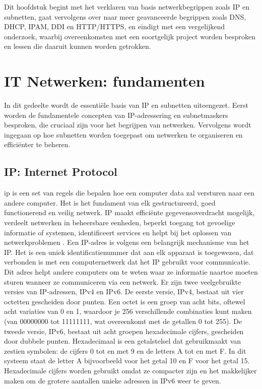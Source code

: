 Dit hoofdstuk begint met het verklaren van basis netwerkbegrippen zoals IP en subnetten, gaat vervolgens over naar meer geavanceerde begrippen zoals DNS, DHCP, IPAM, DDI en HTTP/HTTPS, en eindigt met een vergelijkend onderzoek, waarbij overeenkomsten met een soortgelijk project worden besproken en lessen die daaruit kunnen worden getrokken.


\section{IT Netwerken: fundamenten}
In dit gedeelte wordt de essentiële basis van IP en subnetten uiteengezet. Eerst worden de fundamentele concepten van IP-adressering en subnetmaskers besproken, die cruciaal zijn voor het begrijpen van netwerken. Vervolgens wordt ingegaan op hoe subnetten worden toegepast om netwerken te organiseren en efficiënter te beheren.

\subsection{IP: Internet Protocol}
\acrfull{ip} is een set van regels die bepalen hoe een computer data zal versturen naar een andere computer. Het is het fundament van elk gestructureerd, goed functionerend en veilig netwerk. IP maakt efficiënte gegevensoverdracht mogelijk, verdeelt netwerken in beheersbare eenheden, beperkt toegang tot gevoelige informatie of systemen, identificeert services en helpt bij het oplossen van netwerkproblemen \autocite{Postel1981}. Een IP-adres is volgens \textcite{Postel1981} een belangrijk mechanisme van het IP. Het is een uniek identificatienummer dat aan elk apparaat is toegewezen, dat verbonden is met een computernetwerk dat het IP gebruikt voor communicatie. Dit adres helpt andere computers om te weten waar ze informatie naartoe moeten sturen wanneer ze communiceren via een netwerk.
Er zijn twee veelgebruikte versies van IP-adressen, IPv4 en IPv6. De eerste versie, IPv4, bestaat uit vier octetten gescheiden door punten. Een octet is een groep van acht bits, oftewel acht variaties van 0 en 1, waardoor je 256 verschillende combinaties kunt maken (van 00000000 tot 11111111, wat overeenkomt met de getallen 0 tot 255). De tweede versie, IPv6, bestaat uit acht groepen hexadecimale cijfers, gescheiden door dubbele punten. Hexadecimaal is een getalstelsel dat gebruikmaakt van zestien symbolen: de cijfers 0 tot en met 9 en de letters A tot en met F. In dit systeem staat de letter A bijvoorbeeld voor het getal 10 en F voor het getal 15. Hexadecimale cijfers worden gebruikt omdat ze compacter zijn en het makkelijker maken om de grotere aantallen unieke adressen in IPv6 weer te geven.

